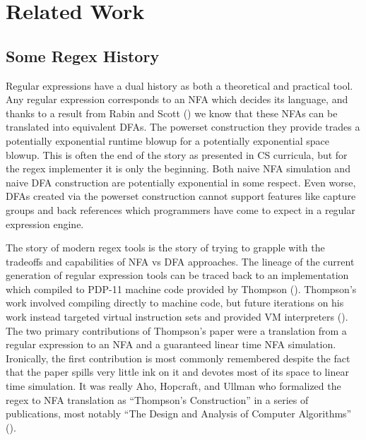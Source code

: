 \chapter{Related Work}
\label{chapter:relatedwork}

\section{Some Regex History}

Regular expressions have a dual history as both a theoretical
and practical tool. Any regular expression corresponds to an
NFA which decides its language, and thanks to a
result from Rabin and Scott (\cite{Rabin1959}) we know that
these NFAs can be translated into equivalent DFAs. The powerset
construction they provide trades a potentially exponential runtime
blowup for a potentially exponential space blowup.
This is often the end of the story as presented in CS curricula,
but for the regex implementer it is only the beginning. Both
naive NFA simulation and naive DFA construction are potentially exponential
in some respect. Even worse, DFAs created via the powerset construction
cannot support features like capture groups and back references 
which programmers have come to expect in a regular expression engine.

The story of modern regex tools is the story of trying to grapple
with the tradeoffs and capabilities of NFA vs DFA approaches.
The lineage of the current generation of regular expression tools
can be traced back to an implementation which compiled
to PDP-11 machine code provided by Thompson (\cite{Thompson1968}).
Thompson's work involved compiling directly to machine code, but
future iterations on his work instead targeted virtual instruction
sets and provided VM interpreters (\cite{CoxVirtualMachineApproach}).
The two primary contributions of Thompson's paper were a translation
from a regular expression to an NFA and a guaranteed linear time
NFA simulation. Ironically, the first contribution is most commonly 
remembered despite the fact that the paper spills very little ink
on it and devotes most of its space to linear time simulation.
It was really Aho, Hopcraft, and Ullman who formalized the regex to NFA
translation as ``Thompson's Construction'' in a series of 
publications, most notably ``The Design and Analysis of Computer Algorithms''
(\cite{Aho1974}).

